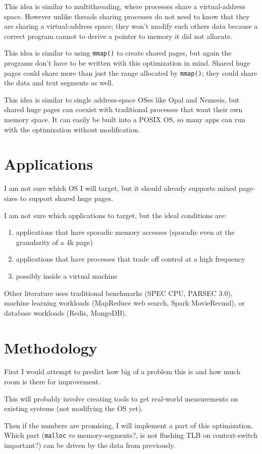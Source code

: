 \documentclass[sigconf,screen,nonacm,natbib]{acmart}
\begin{document}
This idea is similar to multithreading, where processes share a virtual-address space. However unlike threads sharing processes do not need to know that they are sharing a virtual-address space; they won't modify each others data because  a correct program cannot to derive a pointer to memory it did not allocate.

This idea is similar to using \texttt{mmap()} to create shared pages, but again the programs don't have to be written with this optimization in mind. Shared huge pages could share more than just the range allocated by \texttt{mmap()}; they could share the data and text segments as well.

This idea is similar to single address-space OSes like Opal\cite{opal} and Nemesis, but shared huge pages can coexist with traditional processes that want their own memory space. It can easily be built into a POSIX OS, so many apps can run with the optimization without modification.

\section{Applications}

I am not sure which OS I will target, but it should already supports mixed page-sizes to support shared huge pages.

I am not sure which applications to target, but the ideal conditions are:
\begin{enumerate}
\item applications that have sporadic memory accesses (sporadic even at the granularity of a 4k page)
\item applications that have processes that trade off control at a high frequency
\item possibly inside a virtual machine
\end{enumerate}

Other literature uses traditional benchmarks (SPEC CPU, PARSEC 3.0), machine learning workloads (MapReduce web search, Spark MovieRecmd), or database workloads (Redis, MongoDB). \cite{ingens}

\section{Methodology}

First I would attempt to predict how big of a problem this is and how much room is there for improvement.

This will probably involve creating tools to get real-world measurements on existing systems (not modifying the OS yet).

Then if the numbers are promising, I will implement a part of this optimization. Which part (\texttt{malloc} vs memory-segments?, is not flushing TLB on context-switch important?) can be driven by the data from previously.


\end{document}
